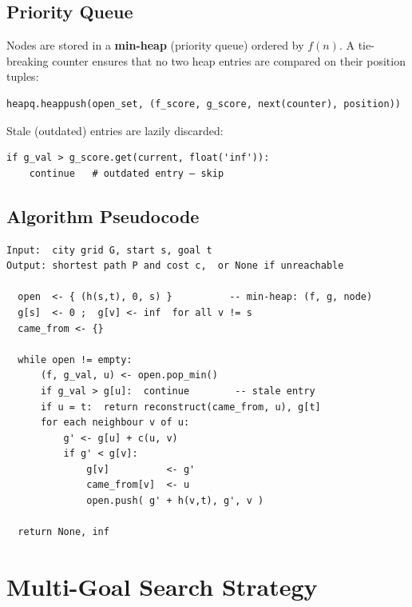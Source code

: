 \documentclass[12pt]{article}
\begin{document}
\subsection{Priority Queue}

Nodes are stored in a \textbf{min-heap} (priority queue) ordered by $f(n)$.
A tie-breaking counter ensures that no two heap entries are compared on their
position tuples:

\begin{lstlisting}[caption={Priority queue push with tie-breaking.}]
heapq.heappush(open_set, (f_score, g_score, next(counter), position))
\end{lstlisting}

Stale (outdated) entries are lazily discarded:

\begin{lstlisting}[caption={Skipping outdated entries.}]
if g_val > g_score.get(current, float('inf')):
    continue   # outdated entry — skip
\end{lstlisting}

\subsection{Algorithm Pseudocode}

\begin{lstlisting}[language={}, caption={A* on 3D City Grid (pseudocode)}, mathescape=true]
Input:  city grid G, start s, goal t
Output: shortest path P and cost c,  or None if unreachable

  open  <- { (h(s,t), 0, s) }          -- min-heap: (f, g, node)
  g[s]  <- 0 ;  g[v] <- inf  for all v != s
  came_from <- {}

  while open != empty:
      (f, g_val, u) <- open.pop_min()
      if g_val > g[u]:  continue        -- stale entry
      if u = t:  return reconstruct(came_from, u), g[t]
      for each neighbour v of u:
          g' <- g[u] + c(u, v)
          if g' < g[v]:
              g[v]          <- g'
              came_from[v]  <- u
              open.push( g' + h(v,t), g', v )

  return None, inf
\end{lstlisting}

\section{Multi-Goal Search Strategy}
\end{document}
